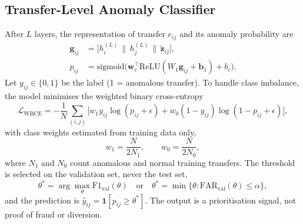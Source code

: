 \documentclass[conference,a4paper]{IEEEtran}
\newcommand{\ind}{\mathbf{1}}
\begin{document}
\subsection{Transfer-Level Anomaly Classifier}
After $L$ layers, the representation of transfer $e_{ij}$ and its anomaly probability are
\begin{align}
\mathbf g_{ij}&=\big[h^{(L)}_i\,\|\,h^{(L)}_j\,\|\,\tilde{\mathbf z}_{ij}\big],\label{eq:g}\\
p_{ij}&=\mathrm{sigmoid}\big(\mathbf w_c^{\top}\mathrm{ReLU}(W_1\mathbf g_{ij}+\mathbf b_1)+b_c\big).\label{eq:p}
\end{align}
Let $y_{ij}\in\{0,1\}$ be the label (1 = anomalous transfer). To handle class imbalance, the model minimises the weighted binary cross-entropy
\begin{equation}
\mathcal L_{\mathrm{WBCE}}=-\frac1N\sum_{(i,j)}\Big[w_1y_{ij}\log(p_{ij}+\epsilon)+w_0(1-y_{ij})\log(1-p_{ij}+\epsilon)\Big],
\label{eq:wbce}
\end{equation}
with class weights estimated from training data only,
\begin{equation}
w_1=\frac{N}{2N_1},\qquad w_0=\frac{N}{2N_0},
\label{eq:w}
\end{equation}
where $N_1$ and $N_0$ count anomalous and normal training transfers. The threshold is selected on the validation set, never the test set,
\begin{equation}
\theta^{*}=\arg\max_{\theta}\mathrm{F1}_{\mathrm{val}}(\theta)\quad\text{or}\quad\theta^{*}=\min\{\theta:\mathrm{FAR}_{\mathrm{val}}(\theta)\le\alpha\},
\label{eq:theta}
\end{equation}
and the prediction is $\hat y_{ij}=\ind[p_{ij}\ge\theta^{*}]$. The output is a prioritisation signal, not proof of fraud or diversion.
\end{document}
